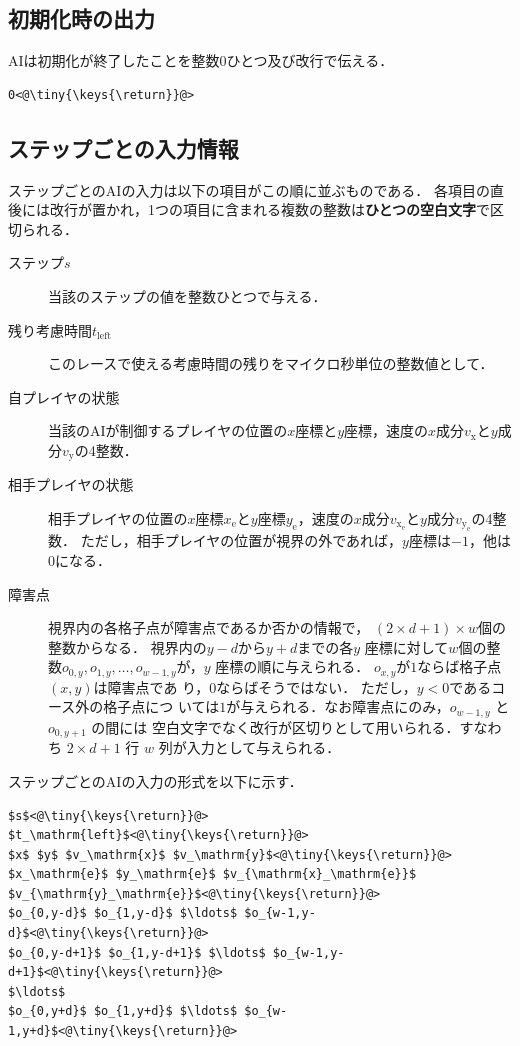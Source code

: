 \documentclass[11pt]{jarticle}
\begin{document}
\subsection{初期化時の出力}\label{sec:output_init}
AIは初期化が終了したことを整数$0$ひとつ及び改行で伝える．

\begin{lstlisting}
0<@\tiny{\keys{\return}}@>
\end{lstlisting}

\subsection{ステップごとの入力情報}
ステップごとのAIの入力は以下の項目がこの順に並ぶものである．
各項目の直後には改行が置かれ，1つの項目に含まれる複数の整数は{\bf ひとつの空白文字}で区切られる．

\begin{description}
\item[ステップ$s$] 当該のステップの値を整数ひとつで与える．
\item[残り考慮時間$t_\mathrm{left}$] このレースで使える考慮時間の残りをマイクロ秒単位の整数値として．
\item[自プレイヤの状態] 当該のAIが制御するプレイヤの位置の$x$座標と$y$座標，速度の$x$成分$v_\mathrm{x}$と$y$成分$v_\mathrm{y}$の4整数．
\item[相手プレイヤの状態] 相手プレイヤの位置の$x$座標$x_\mathrm{e}$と$y$座標$y_\mathrm{e}$，速度の$x$成分$v_{\mathrm{x}_\mathrm{e}}$と$y$成分$v_{\mathrm{y}_\mathrm{e}}$の4整数．
  ただし，相手プレイヤの位置が視界の外であれば，$y$座標は$-1$，他は$0$になる．
\item[障害点] 視界内の各格子点が障害点であるか否かの情報で，
  $(2\times d+1)\times w$個の整数からなる． 視界内の$y-d$から$y+d$までの各$y$
  座標に対して$w$個の整数$o_{0,y}, o_{1,y}, \ldots, o_{w-1,y}$が，$y$
  座標の順に与えられる．  $o_{x,y}$が$1$ならば格子点$(x,y)$は障害点であ
  り，$0$ならばそうではない．  ただし，$y<0$であるコース外の格子点につ
  いては$1$が与えられる．なお障害点にのみ，$o_{w-1,y}$ と $o_{0,y+1}$ の間には
  空白文字でなく改行が区切りとして用いられる．すなわち $2\times d+1$ 行 $w$ 列が入力として与えられる．
\end{description}

ステップごとのAIの入力の形式を以下に示す．
\begin{lstlisting}
$s$<@\tiny{\keys{\return}}@>
$t_\mathrm{left}$<@\tiny{\keys{\return}}@>
$x$ $y$ $v_\mathrm{x}$ $v_\mathrm{y}$<@\tiny{\keys{\return}}@>
$x_\mathrm{e}$ $y_\mathrm{e}$ $v_{\mathrm{x}_\mathrm{e}}$ $v_{\mathrm{y}_\mathrm{e}}$<@\tiny{\keys{\return}}@>
$o_{0,y-d}$ $o_{1,y-d}$ $\ldots$ $o_{w-1,y-d}$<@\tiny{\keys{\return}}@>
$o_{0,y-d+1}$ $o_{1,y-d+1}$ $\ldots$ $o_{w-1,y-d+1}$<@\tiny{\keys{\return}}@>
$\ldots$
$o_{0,y+d}$ $o_{1,y+d}$ $\ldots$ $o_{w-1,y+d}$<@\tiny{\keys{\return}}@>
\end{lstlisting}
\end{document}
